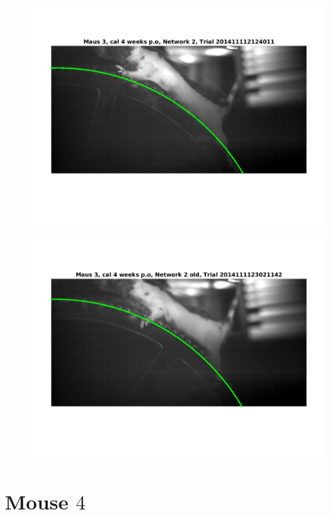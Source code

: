 \documentclass[
	fontsize=12pt,
	paper=a4,
	twoside=false,
	numbers=noenddot,
	plainheadsepline,
	toc=listof,
	toc=bibliography
]{scrartcl}
\begin{document}
\begin{figure} [htb] \centering
	\includegraphics[scale = 0.6]{images/mouse3/result_Maus_3_cal_4_weeks_Network_2.png}
\end{figure}
\begin{figure} [htb] \centering
	\includegraphics[scale = 0.6]{images/mouse3/result_Maus_3_cal_4_weeks_Network_2_old.png}
\end{figure}

\FloatBarrier

\section*{Mouse $4$}
\end{document}
